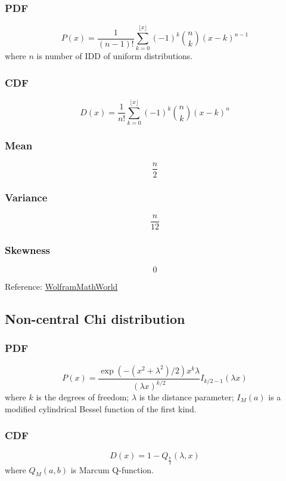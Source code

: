 \subsubsection*{PDF}
\[
    P(x) = \frac{1}{(n-1)!} \sum_{{k=0}}^{{\lfloor x\rfloor }}
        (-1)^{k}{\binom{n}{k}}(x-k)^{{n-1}}
\]
where $n$ is number of IDD of uniform distributions.

\subsubsection*{CDF}
\[
    D(x) = \frac{1}{n!} \sum_{{k=0}}^{{\lfloor x\rfloor}}
        (-1)^{k}{\binom{n}{k}}(x-k)^{n}
\]

\subsubsection*{Mean}
\[
    \frac{n}{2}
\]

\subsubsection*{Variance}
\[
    \frac{n}{12}
\]

\subsubsection*{Skewness}
\[
    0
\]

Reference:
\href{https://en.wikipedia.org/wiki/Irwin%E2%80%93Hall_distribution}{WolframMathWorld}

\subsection{Non-central Chi distribution}

\subsubsection*{PDF}
\[
    P(x) = {\frac{\exp{(-(x^{2}+\lambda^{2})/2)}x^{k}\lambda}
        {(\lambda x)^{k/2}}}
        I_{k/2-1}(\lambda x)
\]
where $k$ is the degrees of freedom; $\lambda$ is the distance parameter;
$I_M(a)$ is a modified cylindrical Bessel function of the first kind.

\subsubsection*{CDF}
\[
    D(x) = 1-Q_{\frac {k}{2}}\left(\lambda ,x\right)
\]
where $Q_M(a,b)$ is Marcum Q-function.

